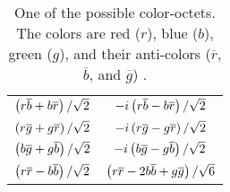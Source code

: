 \begin{table}[h]
    \centering
    \begin{center}
        \begin{tabular}{c  c}
            $\left( r \overline{b} + b \overline{r} \right) / \sqrt{2}$ &
            $-i \left( r \overline{b} - b \overline{r} \right) / \sqrt{2}$ \\
            $\left( r \overline{g} + g \overline{r} \right) / \sqrt{2}$ &
            $-i \left( r \overline{g} - g \overline{r} \right) / \sqrt{2}$ \\
            $\left( b \overline{g} + g \overline{b} \right) / \sqrt{2}$ &
            $-i \left( b \overline{g} - g \overline{b} \right) / \sqrt{2}$ \\
            $\left( r \overline{r} - b \overline{b} \right) / \sqrt{2}$ &
            $\left( r \overline{r} - 2b \overline{b} + g \overline{g} \right) / \sqrt{6}$ \\
        \end{tabular}
        \caption[
            One possible QCD color-octet.
        ]{
            One of the possible color-octets. The colors are red ($r$), blue ($b$),
            green ($g$), and their anti-colors ($\overline{r}$, $\overline{b}$, and
            $\overline{g}$) .
        }
        \label{table:gluon_color}
    \end{center}
\end{table}
